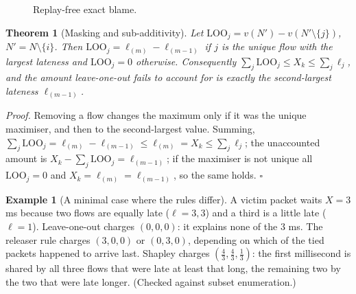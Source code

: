 \documentclass[11pt]{article}
\newtheorem{theorem}{Theorem}
\theoremstyle{definition}
\newtheorem{example}{Example}
\begin{document}
\begin{figure}[h]
\centering\small
{}
\caption{Replay-free exact blame.}\label{alg:blame}
\end{figure}

\begin{theorem}[Masking and sub-additivity]\label{thm:masking}
Let $\mathrm{LOO}_j=v(N')-v(N'\setminus\{j\})$, $N'=N\setminus\{i\}$. Then $\mathrm{LOO}_j=\ell_{(m)}-\ell_{(m-1)}$ if $j$ is the unique flow with the largest lateness and $\mathrm{LOO}_j=0$ otherwise. Consequently $\sum_j\mathrm{LOO}_j\le X_k\le\sum_j\ell_j$, and the amount leave-one-out fails to account for is exactly the second-largest lateness $\ell_{(m-1)}$.
\end{theorem}
\emph{Proof.} Removing a flow changes the maximum only if it was the unique maximiser, and then to the second-largest value. Summing, $\sum_j\mathrm{LOO}_j=\ell_{(m)}-\ell_{(m-1)}\le\ell_{(m)}=X_k\le\sum_j\ell_j$; the unaccounted amount is $X_k-\sum_j\mathrm{LOO}_j=\ell_{(m-1)}$; if the maximiser is not unique all $\mathrm{LOO}_j=0$ and $X_k=\ell_{(m)}=\ell_{(m-1)}$, so the same holds. \hfill$\square$

\begin{example}[A minimal case where the rules differ]\label{ex:tie}
A victim packet waits $X=3$ ms because two flows are equally late ($\ell=3,3$) and a third is a little late ($\ell=1$). Leave-one-out charges $(0,0,0)$: it explains none of the 3 ms. The releaser rule charges $(3,0,0)$ or $(0,3,0)$, depending on which of the tied packets happened to arrive last. Shapley charges $(\tfrac43,\tfrac43,\tfrac13)$: the first millisecond is shared by all three flows that were late at least that long, the remaining two by the two that were late longer. (Checked against subset enumeration.)
\end{example}
\end{document}
